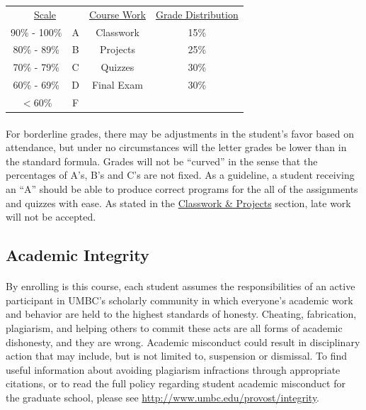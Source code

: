 \documentclass[letter,10pt]{article}
\begin{document}
\begin{center}
\begin{tabular}{ c c || c c}
\multicolumn{2}{c||}{\underline{Scale}} & \underline{Course Work} & \underline{Grade Distribution} \\
90\% - 100\% & A & Classwork & 15\% \\
80\% - 89\%  & B & Projects & 25\% \\
70\% - 79\%  & C & Quizzes & 30\% \\ 
60\% - 69\%  & D & Final Exam & 30\% \\
$<$60\%      & F & 
\end{tabular}
\end{center}

\paragraph{}For borderline grades, there may be adjustments in the student's favor based on attendance, but under no circumstances will the letter grades be lower than in the standard formula. Grades will not be ``curved'' in the sense that the percentages of A's, B's and C's are not fixed. As a guideline, a student receiving an ``A'' should be able to produce correct programs for the all of the assignments and quizzes with ease. As stated in the \hyperlink{sec:cwhw}{Classwork \& Projects} section, late work will not be accepted.

\subsection*{Academic Integrity}
\paragraph{}By enrolling is this course, each student assumes the responsibilities of an active participant in UMBC's scholarly community in which everyone's academic work and behavior are held to the highest standards of honesty. Cheating, fabrication, plagiarism, and helping others to commit these acts are all forms of academic dishonesty, and they are wrong. Academic misconduct could result in disciplinary action that may include, but is not limited to, suspension or dismissal. To find useful information about avoiding plagiarism infractions through appropriate citations, or to read the full policy regarding student academic misconduct for the graduate school, please see \url{http://www.umbc.edu/provost/integrity}.
\end{document}
